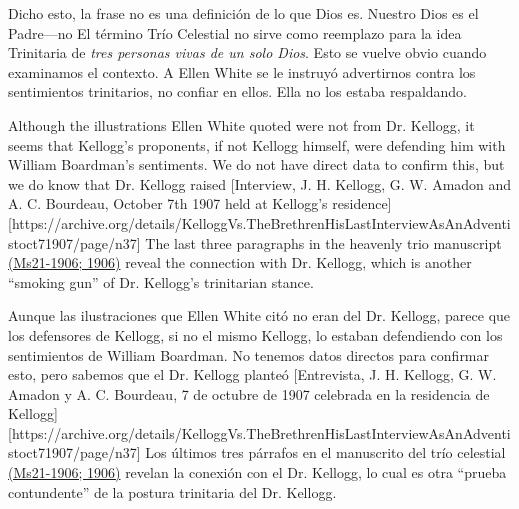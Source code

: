 Dicho esto, la frase  no es una definición de lo que Dios es. Nuestro Dios es el Padre—no  El término Trío Celestial no sirve como reemplazo para la idea Trinitaria de \textit{tres personas vivas de un solo Dios}. Esto se vuelve obvio cuando examinamos el contexto. A Ellen White se le instruyó advertirnos contra los sentimientos trinitarios, no confiar en ellos. Ella no los estaba respaldando.


Although the illustrations Ellen White quoted were not from Dr. Kellogg, it seems that Kellogg's proponents, if not Kellogg himself, were defending him with William Boardman's sentiments. We do not have direct data to confirm this, but we do know that Dr. Kellogg raised [Interview, J. H. Kellogg, G. W. Amadon and A. C. Bourdeau, October 7th 1907 held at Kellogg’s residence][https://archive.org/details/KelloggVs.TheBrethrenHisLastInterviewAsAnAdventistoct71907/page/n37] The last three paragraphs in the heavenly trio manuscript \href{https://egwwritings.org/?ref=en_Ms21-1906&para=9754.1}{(Ms21-1906; 1906)} reveal the connection with Dr. Kellogg, which is another “smoking gun” of Dr. Kellogg's trinitarian stance.


Aunque las ilustraciones que Ellen White citó no eran del Dr. Kellogg, parece que los defensores de Kellogg, si no el mismo Kellogg, lo estaban defendiendo con los sentimientos de William Boardman. No tenemos datos directos para confirmar esto, pero sabemos que el Dr. Kellogg planteó [Entrevista, J. H. Kellogg, G. W. Amadon y A. C. Bourdeau, 7 de octubre de 1907 celebrada en la residencia de Kellogg][https://archive.org/details/KelloggVs.TheBrethrenHisLastInterviewAsAnAdventistoct71907/page/n37] Los últimos tres párrafos en el manuscrito del trío celestial \href{https://egwwritings.org/?ref=en_Ms21-1906&para=9754.1}{(Ms21-1906; 1906)} revelan la conexión con el Dr. Kellogg, lo cual es otra “prueba contundente” de la postura trinitaria del Dr. Kellogg.


